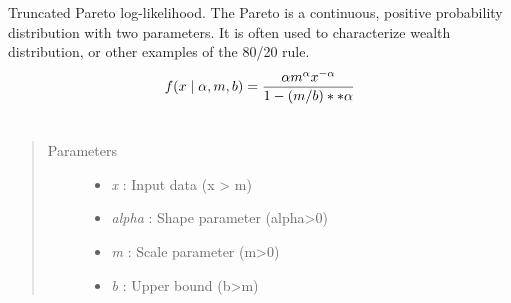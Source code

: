 \documentclass[letterpaper,10pt,english]{sphinxmanual}
\begin{document}
\begin{fulllineitems}
\label{distributions:pymc.distributions.truncated_pareto_like}
Truncated Pareto log-likelihood. The Pareto is a continuous, positive 
probability distribution with two parameters. It is often used
to characterize wealth distribution, or other examples of the
80/20 rule.
\begin{gather}
\begin{split}f(x \mid \alpha, m, b) = \frac{\alpha m^{\alpha} x^{-\alpha}}{1-(m/b)**{\alpha}}\end{split}\notag\\\begin{split}\end{split}\notag
\end{gather}\begin{quote}\begin{description}
\item[{Parameters }] \leavevmode\begin{itemize}
\item {} 
\emph{x} : Input data (x \textgreater{} m)

\item {} 
\emph{alpha} : Shape parameter (alpha\textgreater{}0)

\item {} 
\emph{m} : Scale parameter (m\textgreater{}0)

\item {} 
\emph{b} : Upper bound (b\textgreater{}m)

\end{itemize}

\end{description}\end{quote}

\end{fulllineitems}

\end{document}
